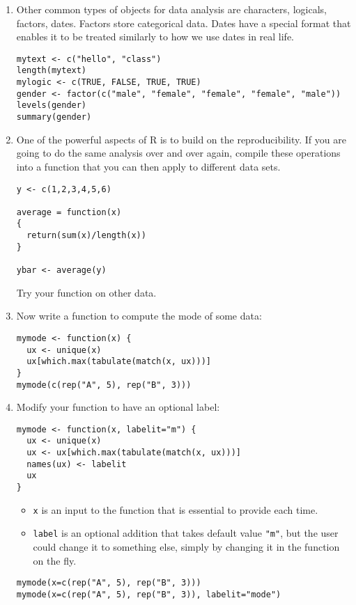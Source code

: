 \documentclass[11pt]{article}
\begin{document}
\begin{enumerate}
\item 
Other common types of objects for data analysis are characters, logicals, factors, dates. Factors store categorical data. Dates have a special format that enables it to be treated similarly to how we use dates in real life.
\begin{verbatim}
mytext <- c("hello", "class")
length(mytext)
mylogic <- c(TRUE, FALSE, TRUE, TRUE)
gender <- factor(c("male", "female", "female", "female", "male"))
levels(gender)
summary(gender)
\end{verbatim}

\item 
One of the powerful aspects of R is to build on the reproducibility. If you are going to do the same analysis over and over again, compile these operations into a function that you can then apply to different data sets. 

\begin{verbatim}
y <- c(1,2,3,4,5,6)

average = function(x)
{
  return(sum(x)/length(x))
}

ybar <- average(y)
\end{verbatim}
Try your function on other data.


\item Now write a function to compute the mode of some data:

\begin{verbatim}
mymode <- function(x) {
  ux <- unique(x)
  ux[which.max(tabulate(match(x, ux)))]
}
mymode(c(rep("A", 5), rep("B", 3)))
\end{verbatim}

\item Modify your function to have an optional label:
\begin{verbatim}
mymode <- function(x, labelit="m") {
  ux <- unique(x)
  ux <- ux[which.max(tabulate(match(x, ux)))]
  names(ux) <- labelit
  ux
}
\end{verbatim}

\begin{itemize}
\item \verb|x| is an input to the function that is essential to provide each time.
\item \verb|label| is an optional addition that takes default value \verb|"m"|, but the user could change it to something else, simply by changing it in the function on the fly.
\end{itemize}
\begin{verbatim}
mymode(x=c(rep("A", 5), rep("B", 3)))
mymode(x=c(rep("A", 5), rep("B", 3)), labelit="mode")
\end{verbatim}


\end{enumerate}
\end{document}
